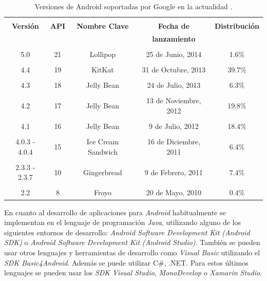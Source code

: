 \begin{spacing}{1.0}
\begin{table}[H]
\centering
\caption{Versiones de Android soportadas por Google en la actualidad \cite{And15}.} 
\begin{tabular}{|c|c|c|c|c|}
\hline 
\rowcolor{gray!30} &&&&\\
\rowcolor{gray!30} \textbf{Versión} & \textbf{API} & \textbf{Nombre Clave} & \textbf{Fecha de}  & \textbf{Distribución}\\ 
\rowcolor{gray!30}  \textbf{} & \textbf{} & \textbf{} & \textbf{lanzamiento} & \textbf{}\\[0.3cm]
\hline 
&&&&\\[-0.2cm]
5.0 & 21 & Lollipop & 25 de Junio, 2014 & 1.6\%\\
\hline 
&&&&\\[-0.2cm]
4.4 & 19 & KitKat & 31 de Octubre, 2013 & 39.7\%\\
\hline 
&&&&\\[-0.2cm]
4.3 & 18 & Jelly Bean & 24 de Julio, 2013 & 6.3\%\\
\hline
&&&&\\[-0.2cm]
4.2 & 17 & Jelly Bean & 13 de Noviembre, 2012 & 19.8\%\\
\hline
&&&&\\[-0.2cm]
4.1 & 16 & Jelly Bean & 9 de Julio, 2012 & 18.4\%\\
\hline
&&&&\\[-0.2cm]
4.0.3 - 4.0.4 & 15 & Ice Cream Sandwich & 16 de Diciembre, 2011 & 6.4\%\\
\hline
&&&&\\[-0.2cm]
2.3.3 - 2.3.7 & 10 & Gingerbread & 9 de Febrero, 2011 & 7.4\%\\
\hline
&&&&\\[-0.2cm]
2.2 & 8 & Froyo & 20 de Mayo, 2010 & 0.4\%\\
\hline
\end{tabular}
\label{tabla_GCM}
\end{table}
\end{spacing}



En cuanto al desarrollo de aplicaciones para \textit{Android} habitualmente se implementan en el lenguaje de programación \textit{Java}, utilizando alguno de los siguientes entornos de desarrollo: \textit{Android Software Development Kit (Android SDK)} o \textit{Android Software Development Kit (Android Studio)}. También se pueden usar otros lenguajes y herramientas de desarrollo como \textit{Visual Basic} utilizando el \textit{SDK Basic4Android}. Además se puede utilizar C\#, .NET. Para estos últimos lenguajes se pueden usar los \textit{SDK Visual Studio}, \textit{MonoDevelop} o \textit{Xamarin Studio}.\\ 

